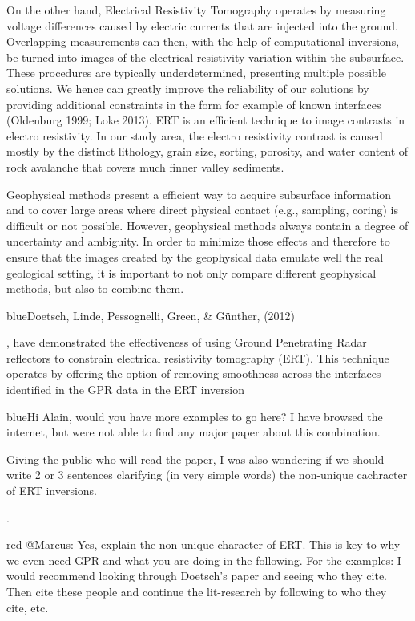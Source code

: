 \documentclass[5p]{elsarticle}
\newcommand{\COMON}{\begin{color}{blue}}
\newcommand{\COMOFF}{\end{color}}
\newcommand{\alon}{\begin{color}{red}}
\newcommand{\aloff}{\end{color}}
\begin{document}
On the other hand, Electrical Resistivity Tomography operates by measuring voltage differences caused by electric currents that are injected into the ground. Overlapping measurements can then, with the help of computational inversions, be turned into images of the electrical resistivity variation within the subsurface. These procedures are typically underdetermined, presenting multiple possible solutions. We hence can greatly improve the reliability of our solutions by providing additional constraints in the form for example of known interfaces (Oldenburg 1999; Loke 2013). ERT is an efficient technique to image contrasts in electro resistivity. In our study area, the electro resistivity contrast is caused mostly by the distinct  lithology, grain size, sorting, porosity, and water content  of rock avalanche that covers much finner valley sediments. 


Geophysical methods present a efficient way to acquire subsurface information and  to cover large areas where direct physical contact (e.g., sampling, coring) is difficult or not possible. However, geophysical methods always contain a degree of  uncertainty and ambiguity. In order to minimize those effects and therefore to ensure that the images created by the geophysical data emulate well the real geological setting, it is important to not only compare different geophysical methods, but also to combine them. \COMON Doetsch, Linde, Pessognelli, Green, \& G\"unther, (2012)\COMOFF, have demonstrated the effectiveness of using Ground Penetrating Radar reflectors to constrain electrical resistivity tomography (ERT). This technique operates by offering the option of removing smoothness across the interfaces identified in the GPR data in the ERT inversion 

\COMON Hi Alain, would you have more examples to go here? I have browsed the internet, but were not able to find any major paper about this combination. 

Giving the public who will read the paper, I was also wondering if
we should write 2 or 3 sentences clarifying (in very simple words)
the  non-unique cachracter of ERT inversions.\COMOFF.

\alon
@Marcus: Yes, explain the non-unique character of ERT. This is key to
why we even need GPR and what you are doing in the following. For the
examples: I would recommend looking through Doetsch's paper and seeing
who they cite. Then cite these people and continue the lit-research by
following to who they cite, etc. 
\aloff
\end{document}
